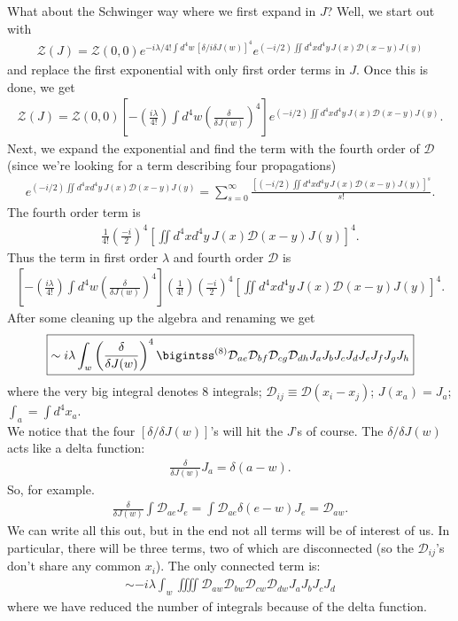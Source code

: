 \documentclass{book}
\theoremstyle{definition}
\newcommand{\f}[2]{\frac{#1}{#2}}
\newcommand{\lp}{\left(}
\newcommand{\rp}{\right)}
\newcommand{\lb}{\left[}
\newcommand{\rb}{\right]}
\newcommand{\D}{\mathcal{D}}
\newcommand{\Z}{\mathcal{Z}}
\begin{document}
What about the Schwinger way where we first expand in $J$? Well, we start out with
\begin{align}
\Z(J) = \Z(0,0)e^{ -i\lambda/4! \int d^4w\, [\delta/i \delta  J(w)]^4 } e^{ (-i/2)\iint d^4x d^4y\, J(x)\D(x-y)J(y) }
\end{align}
and replace the first exponential with only first order terms in $J$. Once this is done, we get
\begin{align}
\Z(J) = \Z(0,0)\lb -\lp\f{i\lambda}{4!}\rp \int d^4w \lp \f{\delta}{\delta J(w)} \rp^4 \rb e^{ (-i/2)\iint d^4x d^4y\, J(x)\D(x-y)J(y) }.
\end{align}
Next, we expand the exponential and find the term with the fourth order of $\D$ (since we're looking for a term describing four propagations)
\begin{align}
e^{ (-i/2)\iint d^4x d^4y\, J(x)\D(x-y)J(y) } = \sum^\infty_{s=0}\f{[(-i/2)\iint d^4x d^4y\, J(x)\D(x-y)J(y)]^s}{s!}.
\end{align}
The fourth order term is 
\begin{align}
\f{1}{4!}\lp \f{-i}{2} \rp^4\lb \iint d^4x d^4y\, J(x)\D(x-y)J(y)  \rb^4.
\end{align}
Thus the term in first order $\lambda$ and fourth order $\D$ is
\begin{align}
\lb -\lp\f{i\lambda}{4!}\rp \int d^4w \lp \f{\delta}{\delta J(w)} \rp^4 \rb\lp\f{1}{4!}\rp\lp \f{-i}{2} \rp^4\lb \iint d^4x d^4y\, J(x)\D(x-y)J(y)  \rb^4.
\end{align}
After some cleaning up the algebra and renaming we get
\begin{align}\label{multi-J}
\boxed{\sim i\lambda \int_w \lp \f{\delta}{\delta J(w)} \rp^4 \bigintss^{(8)}  \D_{ae}\D_{bf}\D_{cg}\D_{dh}J_aJ_bJ_cJ_dJ_eJ_fJ_gJ_h}
\end{align}
where the very big integral denotes 8 integrals; $\D_{ij} \equiv \D(x_i - x_j)$; $J(x_a) = J_a$; $\int_a = \int d^4x_a$. \\

We notice that the four $[\delta/\delta J(w)]$'s will hit the $J$'s of course. The $\delta/\delta J(w)$ acts like a delta function:
\begin{align}
\f{\delta}{\delta J(w)}J_a = \delta(a-w).
\end{align}
So, for example.
\begin{align}
\f{\delta}{\delta J(w)}\int \D_{ae}J_e = \int \D_{ae}\delta (e-w)J_e = \D_{aw}.
\end{align}
We can write all this out, but in the end not all terms will be of interest of us. In particular, there will be three terms, two of which are disconnected (so the $\D_{ij}$'s don't share any common $x_i$). The only connected term is:
\begin{align}
\sim -i\lambda \int_w  \iiiint \D_{aw}\D_{bw}\D_{cw}\D_{dw}J_aJ_bJ_cJ_d
\end{align}
where we have reduced the number of integrals because of the delta function. \\
\end{document}
